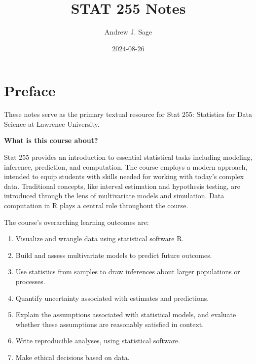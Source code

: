 \documentclass[
  letterpaper,
  DIV=11,
  numbers=noendperiod]{scrreprt}
\title{STAT 255 Notes}
\author{Andrew J. Sage}
\date{2024-08-26}
\providecommand{\tightlist}{%
  \setlength{\itemsep}{0pt}\setlength{\parskip}{0pt}}\usepackage{longtable,booktabs,array}
\renewcommand*\contentsname{Table of contents}
\newcommand\contentsname{Table of contents}
\begin{document}
\maketitle

\renewcommand*\contentsname{Table of contents}
{
\hypersetup{linkcolor=}
\setcounter{tocdepth}{2}
\tableofcontents
}

\chapter*{Preface}\label{preface}


These notes serve as the primary textual resource for Stat 255:
Statistics for Data Science at Lawrence University.

\textbf{What is this course about?}

Stat 255 provides an introduction to essential statistical tasks
including modeling, inference, prediction, and computation. The course
employs a modern approach, intended to equip students with skills needed
for working with today's complex data. Traditional concepts, like
interval estimation and hypothesis testing, are introduced through the
lens of multivariate models and simulation. Data computation in R plays
a central role throughout the course.

The course's overarching learning outcomes are:

\begin{enumerate}
\def\labelenumi{\arabic{enumi}.}
\tightlist
\item
  Visualize and wrangle data using statistical software R.\\
\item
  Build and assess multivariate models to predict future outcomes.\\
\item
  Use statistics from samples to draw inferences about larger
  populations or processes.\\
\item
  Quantify uncertainty associated with estimates and predictions.\\
\item
  Explain the assumptions associated with statistical models, and
  evaluate whether these assumptions are reasonably satisfied in
  context.\\
\item
  Write reproducible analyses, using statistical software.\\
\item
  Make ethical decisions based on data.
\end{enumerate}
\end{document}

